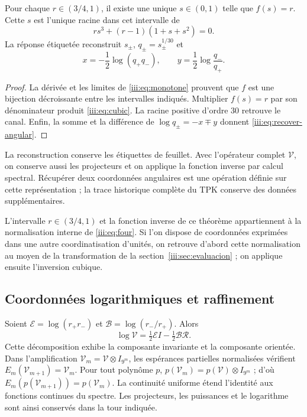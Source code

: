 \begin{theorem}
Pour chaque $r\in(3/4,1)$, il existe une unique $s\in(0,1)$ telle que $f(s)=r$.
Cette $s$ est l’unique racine dans cet intervalle de
\begin{equation}
 r s^3+(r-1)(1+s+s^2)=0.
 \label{iii:eq:cubic}
\end{equation}
La réponse étiquetée reconstruit $s_\pm$, $q_\pm=s_\pm^{1/30}$ et
\begin{equation}
 x=-\frac12\log(q_+q_-),\qquad
 y=\frac12\log\frac{q_-}{q_+}.
 \label{iii:eq:recover-angular}
\end{equation}
\end{theorem}
\begin{proof}
La dérivée et les limites de \eqref{iii:eq:monotone} prouvent que $f$ est une
bijection décroissante entre les intervalles indiqués. Multiplier $f(s)=r$
par son dénominateur produit \eqref{iii:eq:cubic}. La racine positive d’ordre
$30$ retrouve le canal. Enfin, la somme et la différence de
$\log q_\pm=-x\mp y$ donnent \eqref{iii:eq:recover-angular}.
\end{proof}

La reconstruction conserve les étiquettes de feuillet. Avec l’opérateur complet
$\mathcal V$, on conserve aussi les projecteurs et on applique la fonction
inverse par calcul spectral. Récupérer deux coordonnées angulaires est une
opération définie sur cette représentation ; la trace historique complète
du TPK conserve des données supplémentaires.

L’intervalle $r\in(3/4,1)$ et la fonction inverse de ce théorème appartiennent
à la normalisation interne de \eqref{iii:eq:four}. Si l’on dispose de
coordonnées exprimées dans une autre coordinatisation d’unités, on retrouve d’abord
cette normalisation au moyen de la transformation de la
section~\ref{iii:sec:evaluacion} ; on applique ensuite l’inversion cubique.



\subsection{Coordonnées logarithmiques et raffinement}

Soient $\mathcal E=\log(r_+r_-)$ et $\mathcal B=\log(r_-/r_+)$. Alors
\begin{equation}
 \log\mathcal V=\tfrac12\mathcal E I-\tfrac12\mathcal B\mathcal R.
 \label{iii:eq:logvac}
\end{equation}
Cette décomposition exhibe la composante invariante et la composante orientée.
Dans l’amplification $\mathcal V_m=\mathcal V\otimes I_{9^m}$, les
espérances partielles normalisées vérifient
$E_m(\mathcal V_{m+1})=\mathcal V_m$. Pour tout polynôme $p$,
$p(\mathcal V_m)=p(\mathcal V)\otimes I_{9^m}$ ; d’où
$E_m(p(\mathcal V_{m+1}))=p(\mathcal V_m)$. La continuité uniforme
étend l’identité aux fonctions continues du spectre. Les projecteurs,
les puissances et le logarithme sont ainsi conservés dans la tour indiquée.


